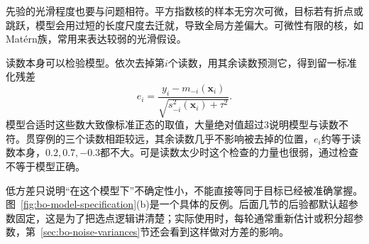 先验的光滑程度也要与问题相符。平方指数核的样本无穷次可微，目标若有折点或跳跃，模型会用过短的长度尺度去迁就，导致全局方差偏大。可微性有限的核，如Mat\'ern族，常用来表达较弱的光滑假设。

读数本身可以检验模型。依次去掉第$i$个读数，用其余读数预测它，得到留一标准化残差
\begin{equation}
 e_i=\frac{y_i-m_{-i}(\bm{x}_i)}{\sqrt{s_{-i}^2(\bm{x}_i)+\tau^2}}.
 \label{eq:bo-loo}
\end{equation}
模型合适时这些数大致像标准正态的取值，大量绝对值超过$3$说明模型与读数不符。贯穿例的三个读数相距较远，其余读数几乎不影响被去掉的位置，$e_i$约等于读数本身，$0.2,0.7,-0.3$都不大。可是读数太少时这个检查的力量也很弱，通过检查不等于模型正确。

低方差只说明“在这个模型下”不确定性小，不能直接等同于目标已经被准确掌握。图~\ref{fig:bo-model-specification}(b)是一个具体的反例。后面几节的后验都默认超参数固定，这是为了把选点逻辑讲清楚；实际使用时，每轮通常重新估计或积分超参数，第~\ref{sec:bo-noise-variances}节还会看到这样做对方差的影响。
